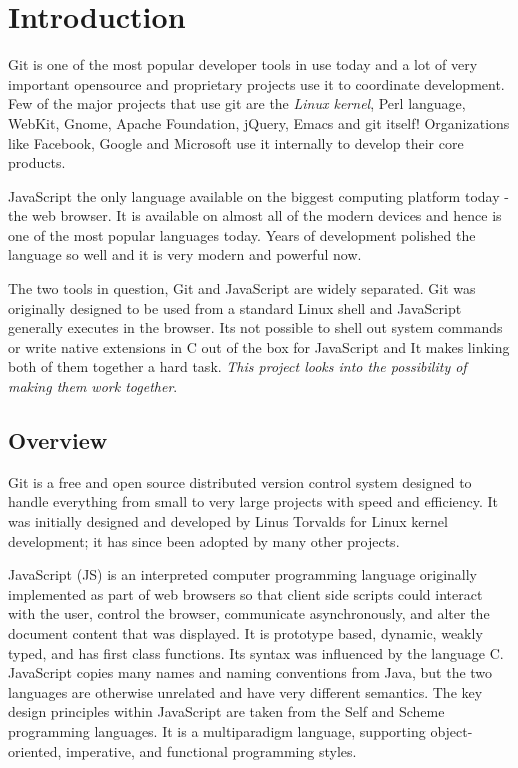 \chapter{Introduction}

Git\cite{git} is one of the most popular developer tools in use today and a lot
of very important opensource and proprietary projects use it to coordinate
development. Few of the major projects that use git are the \textit{Linux
  kernel}, Perl language, WebKit, Gnome, Apache Foundation, jQuery, Emacs and
git itself! Organizations like Facebook, Google and Microsoft use it internally
to develop their core products.

JavaScript\cite{javascript} the only language available on the biggest computing
platform today - the web browser. It is available on almost all of the modern
devices and hence is one of the most popular languages today. Years of
development polished the language so well and it is very modern and powerful
now.

The two tools in question, Git and JavaScript are widely separated. Git was
originally designed to be used from a standard Linux shell and JavaScript
generally executes in the browser. Its not possible to shell out system commands
or write native extensions in C out of the box for JavaScript and It makes
linking both of them together a hard task. \textit{This project looks into the
  possibility of making them work together}.

\section{Overview}

Git is a free and open source distributed version control system designed to
handle everything from small to very large projects with speed and efficiency.
It was initially designed and developed by Linus Torvalds for Linux kernel
development; it has since been adopted by many other projects.

JavaScript (JS) is an interpreted computer programming language originally
implemented as part of web browsers so that client side scripts could interact
with the user, control the browser, communicate asynchronously, and alter the
document content that was displayed. It is prototype based, dynamic, weakly
typed, and has first class functions. Its syntax was influenced by the language
C. JavaScript copies many names and naming conventions from Java, but the two
languages are otherwise unrelated and have very different semantics. The key
design principles within JavaScript are taken from the Self and Scheme
programming languages. It is a multiparadigm language, supporting
object-oriented, imperative, and functional programming styles.

